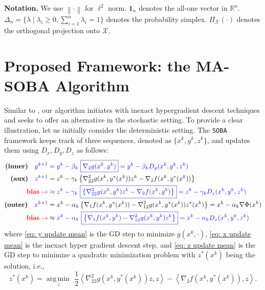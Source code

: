 \documentclass[10pt]{article}
\theoremstyle{remark}
\newcommand{\cX}{\mathcal{X}}
\newcommand{\realset}{\mathbb{R}}
\newcommand{\norm}[1]{\left\|#1\right\|}
\newcommand{\bfone}{\mathbf{1}}
\newcommand{\red}[1]{\textcolor{red}{#1}}
\newcommand{\blue}[1]{\textcolor{blue}{#1}}
\DeclareMathOperator*{\argmin}{arg\,min\,}
\def\<#1,#2>{\left\langle #1,#2\right\rangle}
\begin{document}
\textbf{Notation.} We use $\norm{\cdot}$ for $\ell^2$ norm. $\bfone_n$ denotes the all-one vector in $\realset^n$. $\Delta_n = \{\lambda\mid \lambda_i\geq 0, \sum_{i=1}^{n}\lambda_i=1\}$ denotes the probability simplex. $\Pi_{\cX}(\cdot)$ denotes the orthogonal projection onto $\cX$. 

\section{Proposed Framework: the MA-SOBA Algorithm}

Similar to \cite{dagreou2022framework, arbel2022amortized}, our algorithm initiates with inexact hypergradient descent techniques and seeks to offer an alternative in the stochastic setting. To provide a clear illustration, let us initially consider the deterministic setting. The \texttt{SOBA} framework keeps track of three sequences, denoted as $\{x^k, y^k, z^k\}$, and updates them using $D_x, D_y, D_z$ as follows:
\begin{align}
   \textbf{(inner)}\quad \blue{y^{k+1}} & = \blue{y^k - \beta_k~\boxed{\nabla_2 g(x^k, y^k)} = y^k - \beta_k D_y(x^k, y^k, z^k)}\label{eq: y update mean}\\
   \textbf{(aux)}\quad  \blue{z^{k+1}} &=  z^k - \gamma_k\left\{\nabla_{22}^2g(x^k,y^*(x^k))z^k - \nabla_2 f(x^k,y^*(x^k))\right\}\notag\\
    \red{\textbf{bias} \rightarrow}&\approx \blue{z^k - \gamma_k~\boxed{\left\{\nabla_{22}^2g(x^k,y^k)z^k - \nabla_2 f(x^k,y^k)\right\}} = z^k -\gamma_k D_z(x^k, y^k, z^k)}  \label{eq: z update mean}\\
    \textbf{(outer)}\quad \blue{x^{k+1}}  &= x^{k} - \alpha_k\left\{\nabla_1 f(x^k, y^*(x^k)) - \nabla_{12}^2 g(x^k, y^*(x^k)) z^*(x^k)\right\}  = x^{k} - \alpha_k \nabla \Phi(x^k) \notag\\
    \red{\textbf{bias} \rightarrow}&\approx \blue{ x^{k} - \alpha_k~\boxed{\left\{\nabla_1 f(x^k, y^k) - \nabla_{12}^2 g(x^k, y^k) z^k\right\}} = x^k - \alpha_k D_x(x^k, y^k, z^k)} \label{eq: x update mean}
\end{align}
where \eqref{eq: y update mean} is the GD step to minimize $g(x^k, \cdot)$, \eqref{eq: x update mean} is the inexact hyper gradient descent step, and \eqref{eq: z update mean} is the GD step to minimize a quadratic minimization problem with $z^*(x^k)$ being the solution, i.e., 
\begin{equation*}
    z^*(x^k) = \underset{z}{\argmin}~\frac{1}{2}\<\nabla_{22}^2g(x^k,y^*(x^k))z, z> - \<\nabla_2 f(x^k,y^*(x^k)), z>.
\end{equation*}
\end{document}
